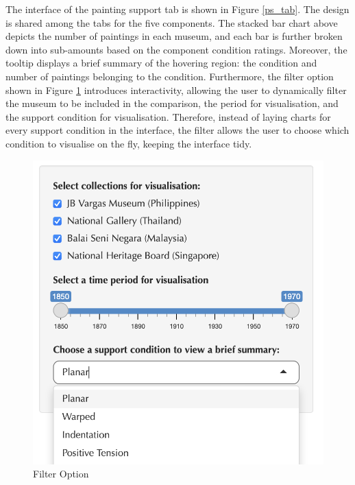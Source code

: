 \documentclass[11pt, oneside]{article}
\begin{document}
The interface of the painting support tab is shown in Figure \ref{ps_tab}. The design is shared among the tabs for the five components. The stacked bar chart above depicts the number of paintings in each museum, and each bar is further broken down into sub-amounts based on the component condition ratings. Moreover, the tooltip displays a brief summary of the hovering region: the condition and number of paintings belonging to the condition.
\bigbreak
\noindent Furthermore, the filter option shown in Figure \ref{filter} introduces interactivity, allowing the user to dynamically filter the museum to be included in the comparison, the period for visualisation, and the support condition for visualisation. Therefore, instead of laying charts for every support condition in the interface, the filter allows the user to choose which condition to visualise on the fly, keeping the interface tidy.
\begin{figure}[H]
    \centering
    \includegraphics[scale=0.4]{images/filter_option.png}
    \caption{Filter Option}
    \label{filter}
\end{figure}
\end{document}
